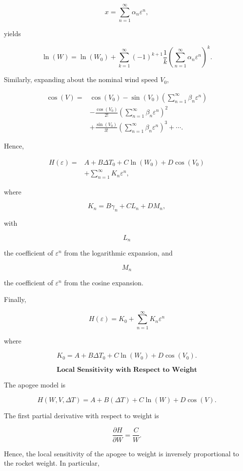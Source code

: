 \documentclass{article}
\begin{document}
\[
x
=
\sum_{n=1}^{\infty}
\alpha_n\varepsilon^n,
\]

yields

\[
\ln(W)
=
\ln(W_0)
+
\sum_{k=1}^{\infty}
(-1)^{k+1}
\frac{1}{k}
\left(
\sum_{n=1}^{\infty}
\alpha_n\varepsilon^n
\right)^k.
\]

Similarly, expanding about the nominal wind speed \(V_0\),

\[
\begin{aligned}
\cos(V)
=
&
\cos(V_0)
-
\sin(V_0)
\left(
\sum_{n=1}^{\infty}
\beta_n\varepsilon^n
\right)
\\
&
-
\frac{\cos(V_0)}{2!}
\left(
\sum_{n=1}^{\infty}
\beta_n\varepsilon^n
\right)^2
\\
&
+
\frac{\sin(V_0)}{3!}
\left(
\sum_{n=1}^{\infty}
\beta_n\varepsilon^n
\right)^3
+\cdots.
\end{aligned}
\]

Hence,

\[
\begin{aligned}
H(\varepsilon)
=
&
A
+
B\Delta T_0
+
C\ln(W_0)
+
D\cos(V_0)
\\
&
+
\sum_{n=1}^{\infty}
K_n
\varepsilon^n,
\end{aligned}
\]

where

\[
K_n
=
B\gamma_n
+
CL_n
+
DM_n,
\]

with

\[
L_n
\]

the coefficient of
\(\varepsilon^n\)
from the logarithmic expansion, and

\[
M_n
\]

the coefficient of
\(\varepsilon^n\)
from the cosine expansion.

Finally,

\[
\boxed{
H(\varepsilon)
=
K_0
+
\sum_{n=1}^{\infty}
K_n
\varepsilon^n
}
\]

where

\[
K_0
=
A
+
B\Delta T_0
+
C\ln(W_0)
+
D\cos(V_0).
\]

\[
\textbf{Local Sensitivity with Respect to Weight}
\]

The apogee model is

\[
H(W,V,\Delta T)
=
A
+
B(\Delta T)
+
C\ln(W)
+
D\cos(V).
\]

The first partial derivative with respect to weight is

\[
\frac{\partial H}{\partial W}
=
\frac{C}{W}.
\]

Hence, the local sensitivity of the apogee to weight is inversely
proportional to the rocket weight. In particular,
\end{document}
